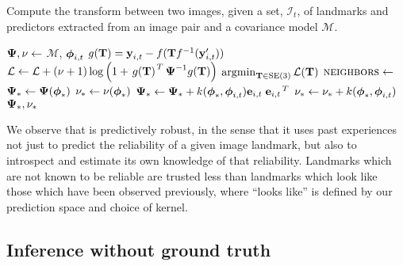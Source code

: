\begin{algorithm}
  \caption{Compute the transform between two images, given a set, $\mathcal{I}_t$,
    of landmarks and predictors extracted from an image pair and a covariance
    model $\mathcal{M}$. }
  \label{alg:compute-transform}
  \begin{algorithmic}
        \State $\boldsymbol{\mathbf{\Psi}}, \nu\gets$  {$\mathcal{M}$, $
          \boldsymbol{\mathbf{\phi}}_{i,t}$}
        \State $g(\boldsymbol{\mathbf{T}}) = \boldsymbol{\mathbf{y}}_{i,t} -
          f( \boldsymbol{\mathbf{T}}f^{-1}(
          \boldsymbol{\mathbf{y}}_{i,t}' ))$
        \State $\mathcal{L} \gets \mathcal{L} +
        (\nu+1)\log\left(1 + \left.{g(\boldsymbol{\mathbf{T}})}\right.^T
          \boldsymbol{\mathbf{\Psi}}^{-1}
        g(\boldsymbol{\mathbf{T}})\right)$
      \EndFor
      \State \Return $\operatorname*{argmin}_{\boldsymbol{\mathbf{T}}\in\text{SE}(3)}\mathcal{L}(\boldsymbol{\mathbf{T}})$
    \EndFunction
      \State $\textsc{neighbors}\gets$ 
      \State{}
      \State $\boldsymbol{\mathbf{\Psi}}_* \gets \boldsymbol{\mathbf{\Psi}}(\boldsymbol{\mathbf{\phi}}_*)$ \State
      $\nu_* \gets \nu(\boldsymbol{\mathbf{\phi}}_*)$
        \State $\boldsymbol{\mathbf{\Psi}}_* \gets \boldsymbol{\mathbf{\Psi}}_* + k(\boldsymbol{\mathbf{\phi}}_*,
          \boldsymbol{\mathbf{\phi}}_{i,t}) \boldsymbol{\mathbf{e}}_{i,t}\left.{\boldsymbol{\mathbf{e}}_{i,t}}\right.^T$
        \State $\nu_* \gets \nu_* + k(\boldsymbol{\mathbf{\phi}}_*, \boldsymbol{\mathbf{\phi}}_{i,t})$
      \EndFor
    \State \Return $\boldsymbol{\mathbf{\Psi}}_*, \nu_*$
    \EndFunction
  \end{algorithmic}
\end{algorithm}

We observe that  is predictively robust, in the
sense that it uses past experiences not just to predict the reliability of a
given image landmark, but also to introspect and estimate its own knowledge of
that reliability.  Landmarks which are not known to be reliable are trusted 
less than landmarks which look like those which have been observed previously, where ``looks like'' is defined by our prediction space and choice of kernel. 

\subsection{Inference without ground truth}

